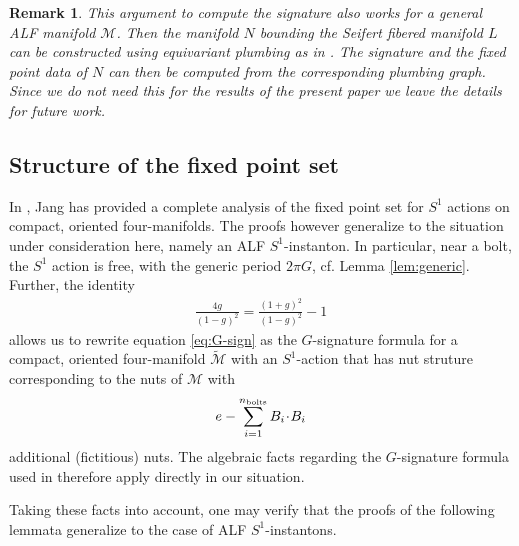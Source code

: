 \documentclass[a4paper,11pt,reqno]{amsart}
\newcommand{\bolt}{B}
\newcommand{\cM}{\mathcal{M}}
\theoremstyle{plain}
\newtheorem{remark}[thm]{Remark}
\newcommand{\nbolts}{n_{\text{\rm bolts}}}
\numberwithin{equation}{section}
\begin{document}
\begin{remark}
This argument to compute the signature also works for a general ALF manifold $\cM$. Then the manifold $N$ bounding the Seifert fibered manifold $L$ can be constructed using equivariant plumbing as in \cite[Chapter~2]{Orlik-seifert-manifolds}. The signature and the fixed point data of $N$ can then be computed from the corresponding plumbing graph. Since we do not need this for the results of the present paper we leave the details for future work.
\end{remark}

%


\subsection{Structure of the fixed point set} 
\label{sec:fps}
In \cite{2018JGP...133..181J}, Jang has provided a complete analysis of the fixed point set for $S^1$ actions on compact, oriented four-manifolds. The proofs however generalize to the situation under consideration here, namely an ALF $S^1$-instanton. In particular, 
%
near a bolt, the $S^1$ action is free, with the generic period $2\pi G$, cf. Lemma \ref{lem:generic}. Further, the identity 
\begin{align} 
\frac{4g}{(1-g)^2} = \frac{(1+g)^2}{(1-g)^2} - 1
\end{align} 
allows us to rewrite equation \eqref{eq:G-sign} as the $G$-signature formula for a compact, oriented four-manifold $\tilde{\cM}$ with an $S^1$-action that has nut struture corresponding to the nuts of $\cM$ with 
\begin{align} 
e-\sum_{i=1}^{\nbolts} \bolt_i \!\cdot\! \bolt_i
\end{align} 
additional (fictitious) nuts. The algebraic facts regarding the $G$-signature formula used in \cite{2018JGP...133..181J} therefore apply directly in our situation. 

Taking these facts into account, one may verify that the proofs of the following lemmata generalize to the case of ALF $S^1$-instantons. 
\end{document}

